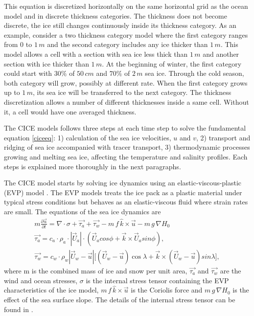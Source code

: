 This equation is discretized horizontally on the same horizontal grid as the ocean model and in discrete thickness categories. The thickness does not become discrete, the ice still changes continuously inside its thickness category. As an example, consider a two thickness category model where the first category ranges from $0$ to $1\, m$ and the second category includes any ice thicker than $1\, m$. This model allows a cell with a section with sea ice less thick than $1\, m$ and another section with ice thicker than $1\, m$. At the beginning of winter, the first category could start with $30\%$ of $50\,cm$ and $70\%$ of $2\,m$ sea ice. Through the cold season, both category will grow, possibly at different rate. When the first category grows up to $1\,m$, its sea ice will be transferred to the next category. The thickness discretization allows a number of different thicknesses inside a same cell. Without it, a cell would have one averaged thickness. 

The CICE models follows three steps at each time step to solve the fundamental equation \eqref{ciceeq}: 1) calculation of the sea ice velocities, $u$ and $v$, 2) transport and ridging of sea ice accompanied with tracer transport, 3) thermodynamic processes growing and melting sea ice, affecting the temperature and salinity profiles. Each steps is explained more thoroughly in the next paragraphs. 

The CICE model starts by solving ice dynamics using an elastic-viscous-plastic (EVP) model \citep{Hunke:1997vn}. The EVP models treats the ice pack as a plastic material under typical stress conditions but behaves as an elastic-viscous fluid where strain rates are small. The equations of the sea ice dynamics are
\begingroup \belowdisplayskip=0pt \abovedisplayskip=0pt
\begin{gather}
m\frac{\partial \vec{u}}{\partial t} = \nabla\cdot\sigma + \vec{\tau_a} + \vec{\tau_w} - m\,f\, \hat{k}\times \vec{u} - m\,g\,\nabla H_0\\
\vec{\tau_a} = c_a \cdot \rho_a \cdot |\vec{U}_a| \cdot (\vec{U}_a cos\phi + \vec{k}\times \vec{U}_a sin\phi),\\
\vec{\tau_w} = c_w \cdot \rho_w |\vec{U}_w - \vec{u}|\big[ (\vec{U}_w - \vec{u}) \cos\lambda + \vec{k}\times(\vec{U}_w - \vec{u})sin\lambda\big],
\end{gather}
\endgroup
where m is the combined mass of ice and snow per unit area, $\vec{\tau_a}$ and $\vec{\tau_w}$ are the wind and ocean stresses, $\sigma$ is the internal stress tensor containing the EVP characteristics of the ice model, $m\,f\, \hat{k}\times \vec{u}$ is the Coriolis force and $m\,g\,\nabla H_0$ is the effect of the sea surface slope. The details of the internal stress tensor can be found in \citet{Hunke:2008ly}.

